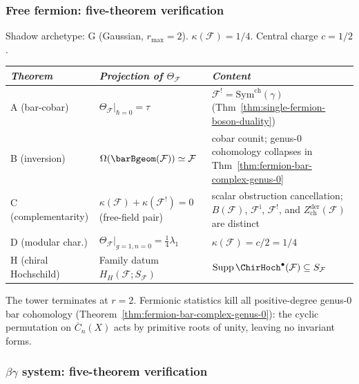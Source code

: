 \subsubsection{Free fermion: five-theorem verification}

\begin{computation}
\label{comp:fermion-five-theorems}
Shadow archetype: G (Gaussian, $r_{\max} = 2$).
$\kappa(\mathcal{F}) = 1/4$.
Central charge $c = 1/2$.
\begin{center}
\small
\renewcommand{\arraystretch}{1.3}
\begin{tabular}{lll}
\toprule
\emph{Theorem} & \emph{Projection of $\Theta_{\mathcal{F}}$}
 & \emph{Content} \\
\midrule
A (bar-cobar) &
 $\Theta_\mathcal{F}\big|_{\hbar=0} = \tau$ &
 $\mathcal{F}^! = \mathrm{Sym}^{\mathrm{ch}}(\gamma)$ (Thm~\ref{thm:single-fermion-boson-duality}) \\
B (inversion) &
 $\Omega(\barBgeom(\mathcal{F})) \simeq \mathcal{F}$ &
 cobar counit; genus-$0$ cohomology collapses in Thm~\ref{thm:fermion-bar-complex-genus-0} \\
C (complementarity) &
 $\kappa(\mathcal{F}) + \kappa(\mathcal{F}^!) = 0$ \textup{(}free-field pair\textup{)} &
 scalar obstruction cancellation; $B(\mathcal F)$,
 $\mathcal F^{\mathrm i}$, $\mathcal F^!$, and
 $Z_{\mathrm{ch}}^{\mathrm{der}}(\mathcal F)$ are distinct \\
D (modular char.) &
 $\Theta_\mathcal{F}\big|_{g=1,n=0} = \tfrac{1}{4}\lambda_1$ &
 $\kappa(\mathcal{F}) = c/2 = 1/4$ \\
H (chiral Hochschild) &
 Family datum $H_H(\mathcal F;S_{\mathcal F})$ &
 $\operatorname{Supp}\ChirHoch^\bullet(\mathcal F)\subseteq
 S_{\mathcal F}$ \\
\bottomrule
\end{tabular}
\end{center}
The tower terminates at $r = 2$.
Fermionic statistics kill all positive-degree genus-$0$ bar cohomology
(Theorem~\ref{thm:fermion-bar-complex-genus-0}):
the cyclic permutation on $\overline{C}_n(X)$ acts by
primitive roots of unity, leaving no invariant forms.
\end{computation}

\subsubsection{$\beta\gamma$ system: five-theorem verification}


